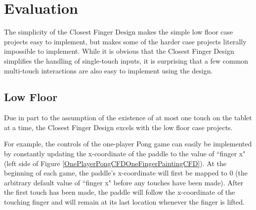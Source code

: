 \section{Evaluation}
The simplicity of the Closest Finger Design makes the simple low floor case projects easy to implement, but makes some of the harder case projects literally impossible to implement. While it is obvious that the Closest Finger Design simplifies the handling of single-touch inputs, it is surprising that a few common multi-touch interactions are also easy to implement using the design.

\subsection{Low Floor}
Due in part to the assumption of the existence of at most one touch on the tablet at a time, the Closest Finger Design excels with the low floor case projects. 

For example, the controls of the one-player Pong game can easily be implemented by constantly updating the x-coordinate of the paddle to the value of ``finger x" (left side of Figure \ref{OnePlayerPongCFDOneFingerPaintingCFD}). At the beginning of each game, the paddle's x-coordinate will first be mapped to $0$ (the arbitrary default value of ``finger x" before any touches have been made). After the first touch has been made, the paddle will follow the x-coordinate of the touching finger and will remain at its last location whenever the finger is lifted.

